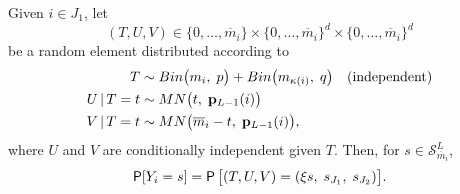 \documentclass[11pt,draft]{article}
\newcommand{\Ssp}{\mathcal{S}}
\newcommand{\pv}{\mathbf{p}}
\newcommand{\mb}{\overline{m}}
\begin{document}
\begin{lem}
Given $i \in J_1$, let
\[ (T, U, V) \in \{0, \dots, \mb_i\} \times
\{0, \dots, \mb_i\}^d \times \{0, \dots, \mb_i\}^d \]
be a random element distributed according to
\begin{align}
T &\sim Bin\big(m_i,\; p\big) + Bin\big(m_{\kappa(i)},\; q\big)
\quad \text{(independent)}\nonumber\\
U \given T = t &\sim MN\big(t,\; \pv_{L-1}(i)\big) \label{eq:mndecompy} \\
V \given T = t &\sim MN\big(\mb_i - t,\; \pv_{L-1}(i)\big),
\nonumber
\end{align}
where $U$ and $V$ are conditionally independent given $T$.
Then, for $s \in \Ssp_{\mb_i}^L$,
\[ \P[Y_i = s] = \P\big[(T, U, V) = (\xi s,\; s_{J_1},\; s_{J_2})
\big]. \]
\end{lem}
\end{document}
